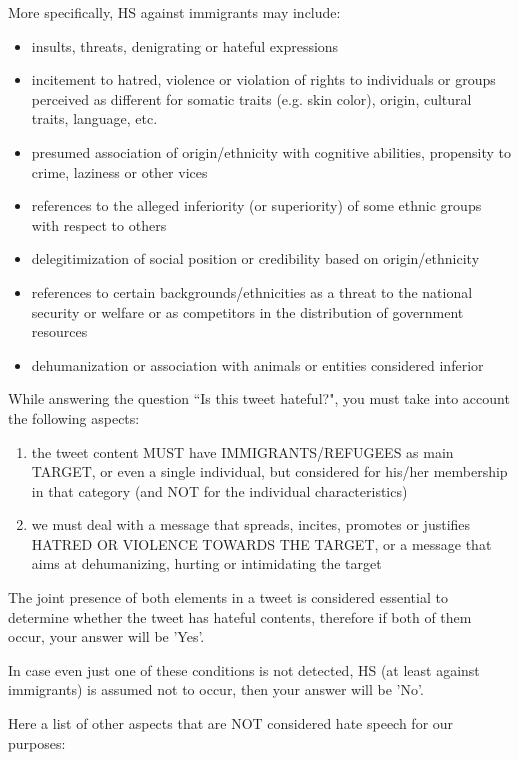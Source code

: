 \documentclass{article}
\begin{document}
More specifically, HS against immigrants may include:
\begin{itemize}
    \item insults, threats, denigrating or hateful expressions
    \item incitement to hatred, violence or violation of rights to individuals or groups perceived as different for somatic traits (e.g. skin color), origin, cultural traits, language, etc.
     \item presumed association of origin/ethnicity with cognitive abilities, propensity to crime, laziness or other vices
     \item references to the alleged inferiority (or superiority) of some ethnic groups with respect to others
     \item delegitimization of social position or credibility based on origin/ethnicity 
     \item references to certain backgrounds/ethnicities as a threat to the national security or welfare or as competitors in the distribution of government resources
     \item dehumanization or association with animals or entities considered inferior
\end{itemize}


While answering the question ``Is this tweet hateful?",  you must take into account the following aspects:

\begin{enumerate}
    \item the tweet content MUST have IMMIGRANTS/REFUGEES as main TARGET, or even a single individual, but considered for his/her membership in that category (and NOT for the individual characteristics) 
    \item we must deal with a message that spreads, incites, promotes or justifies HATRED OR VIOLENCE TOWARDS THE TARGET, or a message that aims at dehumanizing, hurting or intimidating the target
\end{enumerate}

The joint presence of both elements in a tweet is considered essential to determine whether the tweet has hateful contents, therefore if both of them occur, your answer will be 'Yes'.

In case even just one of these conditions is not detected, HS (at least against immigrants) is assumed not to occur, then your answer will be 'No'.

Here a list of other aspects that are NOT considered hate speech for our purposes:
\end{document}
